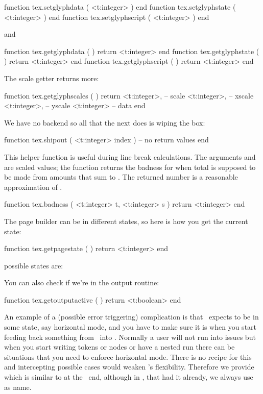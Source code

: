 \starttyping[option=LUA]
function tex.setglyphdata   ( <t:integer> ) end
function tex.setglyphstate  ( <t:integer> ) end
function tex.setglyphscript ( <t:integer> ) end
\stoptyping

and

\starttyping[option=LUA]
function tex.getglyphdata   ( ) return <t:integer> end
function tex.getglyphstate  ( ) return <t:integer> end
function tex.getglyphscript ( ) return <t:integer> end
\stoptyping

The scale getter returns more:

\starttyping[option=LUA]
function tex.getglyphscales ( )
    return
        <t:integer>, -- scale
        <t:integer>, -- xscale
        <t:integer>, -- yscale
        <t:integer>  -- data
end
\stoptyping

\stopsubsection

\startsubsection [title={Whatever}]

We have no backend so all that the next does is wiping the box:

\starttyping[option=LUA]
function tex.shipout ( <t:integer> index )
    -- no return values
end
\stoptyping

This helper function is useful during line break calculations. The arguments
 and  are scaled values; the function returns the badness for
when total  is supposed to be made from amounts that sum to .
The returned number is a reasonable approximation of .

\starttyping[option=LUA]
function tex.badness (
    <t:integer> t,
    <t:integer> s
)
    return <t:integer>
end
\stoptyping

The page builder can be in different states, so here is how you get the current state:

\starttyping[option=LUA]
function tex.getpagestate ( )
    return <t:integer>
end
\stoptyping

possible states are:

\starttworows
{}
\stoptworows

You can also check if we're in the output routine:

\starttyping[option=LUA]
function tex.getoutputactive ( )
    return <t:boolean>
end
\stoptyping

An example of a (possible error triggering) complication is that \TEX\ expects to
be in some state, say horizontal mode, and you have to make sure it is when you
start feeding back something from \LUA\ into \TEX. Normally a user will not run
into issues but when you start writing tokens or nodes or have a nested run there
can be situations that you need to enforce horizontal mode. There is no recipe
for this and intercepting possible cases would weaken \LUATEX's flexibility.
Therefore we provide  which is similar to \type {\quitvmode} at
the \TEX\ end, although in \CONTEXT, that had it already, we always use \type
{\dontleavehmode} as name.

